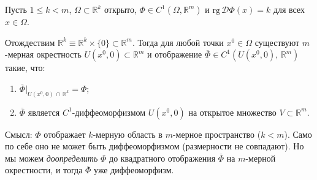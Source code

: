 
\begin{theorem}
  \label{theorem:extension}
  Пусть $1 \leq k < m$, $\Omega \subset \mathbb{R}^k$ открыто,
  $\Phi \in C^1(\Omega, \mathbb{R}^m)$ и
  $\mathrm{rg}\,\mathcal{D}\Phi(x) = k$ для всех $x \in \Omega$.

  Отождествим $\mathbb{R}^k \equiv \mathbb{R}^k \times \{0\} \subset \mathbb{R}^m$.
  Тогда для любой точки $x^0 \in \Omega$ существуют
  $m$-мерная окрестность $U(x^0, 0) \subset \mathbb{R}^m$ и
  отображение $\overline{\Phi} \in C^1(U(x^0,0),\, \mathbb{R}^m)$ такие, что:
  \begin{enumerate}
    \item $\overline{\Phi}\big|_{U(x^0,0)\,\cap\,\mathbb{R}^k} = \Phi$;
    \item $\overline{\Phi}$ является $C^1$-диффеоморфизмом $U(x^0,0)$
          на открытое множество $V \subset \mathbb{R}^m$.
  \end{enumerate}
\end{theorem}

\begin{note}
  Смысл: $\Phi$ отображает $k$-мерную область в $m$-мерное пространство
  ($k < m$). Само по себе оно не может быть диффеоморфизмом
  (размерности не совпадают). Но мы можем \emph{доопределить}
  $\Phi$ до квадратного отображения $\overline{\Phi}$ на $m$-мерной
  окрестности, и тогда $\overline{\Phi}$ уже диффеоморфизм.
\end{note}

